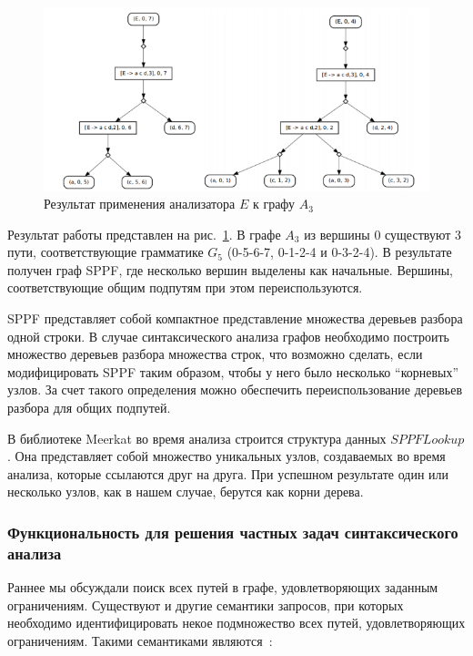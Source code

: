 \begin{figure}
 \centering
 \includegraphics[width=\textwidth]{Smolina/pics/Trees2.png}
 \caption{Результат применения анализатора $E$ к графу $A_3$}
 \label{Trees2}
\end{figure}

Результат работы представлен на рис.~\ref{Trees2}. В графе $A_3$ из вершины 0 существуют 3 пути, соответствующие грамматике $G_5$ (0-5-6-7, 0-1-2-4 и 0-3-2-4). В результате получен граф SPPF, где несколько вершин выделены как начальные. Вершины, соответствующие общим подпутям при этом переиспользуются.

SPPF представляет собой компактное представление множества деревьев разбора одной строки. В случае синтаксического анализа графов необходимо построить множество деревьев разбора множества строк, что возможно сделать, если модифицировать SPPF таким образом, чтобы у него было несколько ``корневых'' узлов. За счет такого определения можно обеспечить переиспользование деревьев разбора для общих подпутей.

В библиотеке Meerkat во время анализа строится структура данных $SPPFLookup$. Она представляет собой множество уникальных узлов, создаваемых во время анализа, которые ссылаются друг на друга. При успешном результате один или несколько узлов, как в нашем случае, берутся как корни дерева.

\subsubsection{Функциональность для решения частных задач синтаксического анализа}

Раннее мы обсуждали поиск всех путей в графе, удовлетворяющих заданным ограничениям. Существуют и другие семантики запросов, при которых необходимо идентифицировать некое подмножество всех путей, удовлетворяющих ограничениям. Такими семантиками являются~\cite{Hellings}:

